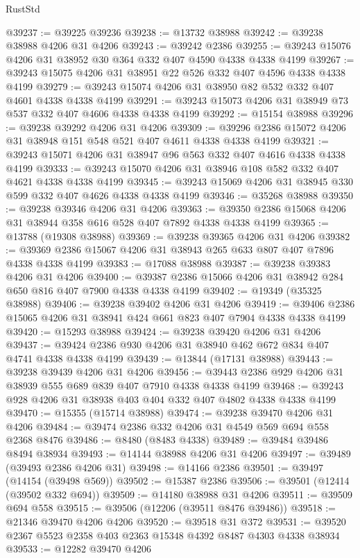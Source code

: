 \begin{lexlean}{RustStd}
\begin{coremodule}
@39237 := @39225 @39236
@39238 := @13732 @38988
@39242 := @39238 @38988 @4206 @31 @4206
@39243 := @39242 @2386
@39255 := @39243 @15076 @4206 @31 @38952 @30 @364 @332 @407 @4590 @4338 @4338 @4199
@39267 := @39243 @15075 @4206 @31 @38951 @22 @526 @332 @407 @4596 @4338 @4338 @4199
@39279 := @39243 @15074 @4206 @31 @38950 @82 @532 @332 @407 @4601 @4338 @4338 @4199
@39291 := @39243 @15073 @4206 @31 @38949 @73 @537 @332 @407 @4606 @4338 @4338 @4199
@39292 := @15154 @38988
@39296 := @39238 @39292 @4206 @31 @4206
@39309 := @39296 @2386 @15072 @4206 @31 @38948 @151 @548 @521 @407 @4611 @4338 @4338 @4199
@39321 := @39243 @15071 @4206 @31 @38947 @96 @563 @332 @407 @4616 @4338 @4338 @4199
@39333 := @39243 @15070 @4206 @31 @38946 @108 @582 @332 @407 @4621 @4338 @4338 @4199
@39345 := @39243 @15069 @4206 @31 @38945 @330 @599 @332 @407 @4626 @4338 @4338 @4199
@39346 := @35268 @38988
@39350 := @39238 @39346 @4206 @31 @4206
@39363 := @39350 @2386 @15068 @4206 @31 @38944 @358 @616 @528 @407 @7892 @4338 @4338 @4199
@39365 := @13788 (@19308 @38988)
@39369 := @39238 @39365 @4206 @31 @4206
@39382 := @39369 @2386 @15067 @4206 @31 @38943 @265 @633 @807 @407 @7896 @4338 @4338 @4199
@39383 := @17088 @38988
@39387 := @39238 @39383 @4206 @31 @4206
@39400 := @39387 @2386 @15066 @4206 @31 @38942 @284 @650 @816 @407 @7900 @4338 @4338 @4199
@39402 := @19349 (@35325 @38988)
@39406 := @39238 @39402 @4206 @31 @4206
@39419 := @39406 @2386 @15065 @4206 @31 @38941 @424 @661 @823 @407 @7904 @4338 @4338 @4199
@39420 := @15293 @38988
@39424 := @39238 @39420 @4206 @31 @4206
@39437 := @39424 @2386 @930 @4206 @31 @38940 @462 @672 @834 @407 @4741 @4338 @4338 @4199
@39439 := @13844 (@17131 @38988)
@39443 := @39238 @39439 @4206 @31 @4206
@39456 := @39443 @2386 @929 @4206 @31 @38939 @555 @689 @839 @407 @7910 @4338 @4338 @4199
@39468 := @39243 @928 @4206 @31 @38938 @403 @404 @332 @407 @4802 @4338 @4338 @4199
@39470 := @15355 (@15714 @38988)
@39474 := @39238 @39470 @4206 @31 @4206
@39484 := @39474 @2386 @332 @4206 @31 @4549 @569 @694 @558 @2368 @8476
@39486 := @8480 (@8483 @4338)
@39489 := @39484 @39486 @8494 @38934
@39493 := @14144 @38988 @4206 @31 @4206
@39497 := @39489 (@39493 @2386 @4206 @31)
@39498 := @14166 @2386
@39501 := @39497 (@14154 (@39498 @569))
@39502 := @15387 @2386
@39506 := @39501 (@12414 (@39502 @332 @694))
@39509 := @14180 @38988 @31 @4206
@39511 := @39509 @694 @558
@39515 := @39506 (@12206 (@39511 @8476 @39486))
@39518 := @21346 @39470 @4206 @4206
@39520 := @39518 @31 @372
@39531 := @39520 @2367 @5523 @2358 @403 @2363 @15348 @4392 @8487 @4303 @4338 @38934
@39533 := @12282 @39470 @4206

\end{coremodule}
\end{lexlean}
